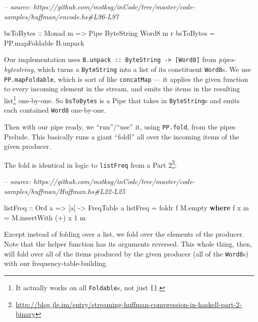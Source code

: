 \documentclass[]{article}
\newenvironment{Shaded}{}{}
\newcommand{\CommentTok}[1]{\textcolor[rgb]{0.38,0.63,0.69}{\textit{#1}}}
\newcommand{\DataTypeTok}[1]{\textcolor[rgb]{0.56,0.13,0.00}{#1}}
\newcommand{\DecValTok}[1]{\textcolor[rgb]{0.25,0.63,0.44}{#1}}
\newcommand{\FunctionTok}[1]{\textcolor[rgb]{0.02,0.16,0.49}{#1}}
\newcommand{\KeywordTok}[1]{\textcolor[rgb]{0.00,0.44,0.13}{\textbf{#1}}}
\newcommand{\NormalTok}[1]{#1}
\newcommand{\OtherTok}[1]{\textcolor[rgb]{0.00,0.44,0.13}{#1}}
\renewcommand{\href}[2]{#2\footnote{\url{#1}}}
\begin{document}
\begin{Shaded}
\begin{Highlighting}[]
\CommentTok{-- source: https://github.com/mstksg/inCode/tree/master/code-samples/huffman/encode.hs#L96-L97}

\OtherTok{bsToBytes ::} \DataTypeTok{Monad}\NormalTok{ m }\OtherTok{=>} \DataTypeTok{Pipe} \DataTypeTok{ByteString} \DataTypeTok{Word8}\NormalTok{ m r}
\NormalTok{bsToBytes }\FunctionTok{=}\NormalTok{ PP.mapFoldable B.unpack}
\end{Highlighting}
\end{Shaded}

Our implementation uses
\texttt{B.unpack\ ::\ ByteString\ -\textgreater{}\ {[}Word8{]}} from
\emph{pipes-bytestring}, which turns a \texttt{ByteString} into a list of its
constituent \texttt{Word8}s. We use \texttt{PP.mapFoldable}, which is sort of
like \texttt{concatMap} --- it applies the given function to every incoming
element in the stream, and emits the items in the resulting list\footnote{It
  actually works on all \texttt{Foldable}s, not just \texttt{{[}{]}}.}
one-by-one. So \texttt{bsToBytes} is a Pipe that takes in \texttt{ByteString}s
and emits each contained \texttt{Word8} one-by-one.

Then with our pipe ready, we ``run''/``use'' it, using \texttt{PP.fold}, from
the pipes Prelude. This basically runs a giant ``foldl'' all over the incoming
items of the given producer.

The fold is identical in logic to \texttt{listFreq} from a
\href{http://blog.jle.im/entry/streaming-huffman-compression-in-haskell-part-2-binary}{Part
2}:

\begin{Shaded}
\begin{Highlighting}[]
\CommentTok{-- source: https://github.com/mstksg/inCode/tree/master/code-samples/huffman/Huffman.hs#L22-L25}

\OtherTok{listFreq ::} \DataTypeTok{Ord}\NormalTok{ a }\OtherTok{=>}\NormalTok{ [a] }\OtherTok{->} \DataTypeTok{FreqTable}\NormalTok{ a}
\NormalTok{listFreq }\FunctionTok{=}\NormalTok{ foldr f M.empty}
  \KeywordTok{where}
\NormalTok{    f x m }\FunctionTok{=}\NormalTok{ M.insertWith (}\FunctionTok{+}\NormalTok{) x }\DecValTok{1}\NormalTok{ m}
\end{Highlighting}
\end{Shaded}

Except instead of folding over a list, we fold over the elements of the
producer. Note that the helper function has its arguments reversed. This whole
thing, then, will fold over all of the items produced by the given producer (all
of the \texttt{Word8}s) with our frequency-table-building.
\end{document}
